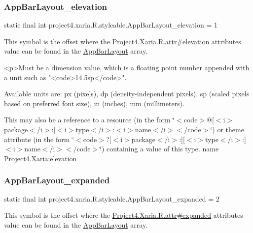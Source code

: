\subsubsection{\texorpdfstring{App\+Bar\+Layout\+\_\+elevation}{AppBarLayout\_elevation}}
{\footnotesize\ttfamily static final int project4.\+xaria.\+R.\+styleable.\+App\+Bar\+Layout\+\_\+elevation = 1\hspace{0.3cm}{\ttfamily [static]}}

This symbol is the offset where the \hyperlink{}{Project4.\+Xaria.\+R.\+attr\#elevation} attribute\textquotesingle{}s value can be found in the \hyperlink{classproject4_1_1xaria_1_1R_1_1styleable_aff523d344137cf82b06e00b519e99093}{App\+Bar\+Layout} array.

\begin{DoxyVerb}      <p>Must be a dimension value, which is a floating point number appended with a unit such as "<code>14.5sp</code>".
\end{DoxyVerb}
 Available units are\+: px (pixels), dp (density-\/independent pixels), sp (scaled pixels based on preferred font size), in (inches), mm (millimeters). 

This may also be a reference to a resource (in the form \char`\"{}$<$code$>$@\mbox{[}$<$i$>$package$<$/i$>$\+:\mbox{]}$<$i$>$type$<$/i$>$\+:$<$i$>$name$<$/i$>$$<$/code$>$\char`\"{}) or theme attribute (in the form \char`\"{}$<$code$>$?\mbox{[}$<$i$>$package$<$/i$>$\+:\mbox{]}\mbox{[}$<$i$>$type$<$/i$>$\+:\mbox{]}$<$i$>$name$<$/i$>$$<$/code$>$\char`\"{}) containing a value of this type.  name Project4.\+Xaria\+:elevation \mbox{\label{classproject4_1_1xaria_1_1R_1_1styleable_a1b7cc06243b8bc9ce47a84699605d28b}} 
\subsubsection{\texorpdfstring{App\+Bar\+Layout\+\_\+expanded}{AppBarLayout\_expanded}}
{\footnotesize\ttfamily static final int project4.\+xaria.\+R.\+styleable.\+App\+Bar\+Layout\+\_\+expanded = 2\hspace{0.3cm}{\ttfamily [static]}}

This symbol is the offset where the \hyperlink{}{Project4.\+Xaria.\+R.\+attr\#expanded} attribute\textquotesingle{}s value can be found in the \hyperlink{classproject4_1_1xaria_1_1R_1_1styleable_aff523d344137cf82b06e00b519e99093}{App\+Bar\+Layout} array.


